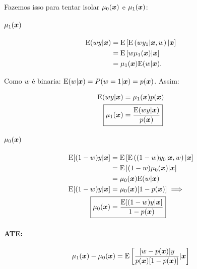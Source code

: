\documentclass[11pt, oneside, a4paper, article]{article}
\numberwithin{equation}{section}
\begin{document}
\begin{description}
\begin{description}
Fazemos isso para tentar isolar $\mu_{0}(\boldsymbol{x})$ e $\mu_{1}(\boldsymbol{x})$:

\paragraph{$\mu_{1}( \boldsymbol{x} )$}

\begin{align*}
\text{E}( w y | \boldsymbol{x} ) &= \text{E}\left[  \text{E} \left( w y_{1} | \boldsymbol{x}, w  \right) | \boldsymbol{x} \right]
\\ &=
\text{E} \left[ w \mu_{1}(\boldsymbol{x}) | \boldsymbol{x} \right]
\\ &=
\mu_{1}(\boldsymbol{x}) \text{E}(w | \boldsymbol{x} ).
\end{align*}

\noindent
Como $w$ é binaria: $\text{E}(w| \boldsymbol{x}) = P(w=1 | \boldsymbol{x}) = p(\boldsymbol{x})$.
Assim:

\vspace{-1 em}
\begin{align*}
\E( w y | \mbs{x} ) &= \mu_{1}(\mbs{x}) p(\mbs{x})
\\
\Aboxed{ \mu_{1}(\mbs{x}) &= \frac{\E(w y | \mbs{x})}{p(\mbs{x})} }
\end{align*}

\paragraph{$\mu_{0}( \boldsymbol{x} )$}

\vspace{-1 em}
\begin{align*}
	\E[ (1-w) y | \mbs{x} ] &= \E\left[  \E \left( (1 - w) y_{0} | \mbs{x}, w  \right) | \mbs{x} \right]
\\ &=
\E \left[ (1 - w) \mu_{0}(\mbs{x}) | \mbs{x} \right]
\\ &=
\mu_{0}(\mbs{x}) \E(w | \mbs{x} )
\\ 
\E[ (1-w) y | \mbs{x} ] 
&=
\mu_{0}(\mbs{x}) [1 - p(\mbs{x})] \implies
\\ 
\Aboxed{
\mu_{0}(\mbs{x})
&=
\frac{\E[ (1-w) y | \mbs{x} ] }{1 - p( \mbs{x} ) } }
\end{align*}

\paragraph{ATE:}

\begin{align*}
\mu_{1}(\boldsymbol{x}) - \mu_{0}(\boldsymbol{x}) =
\text{E}\left[ 
\frac{[w - p(\boldsymbol{x})] y}{p(\boldsymbol{x}) [1 - p(\boldsymbol{x})]}
| \boldsymbol{x}
\right]
\end{align*}


\end{description}
\end{description}
\end{document}
